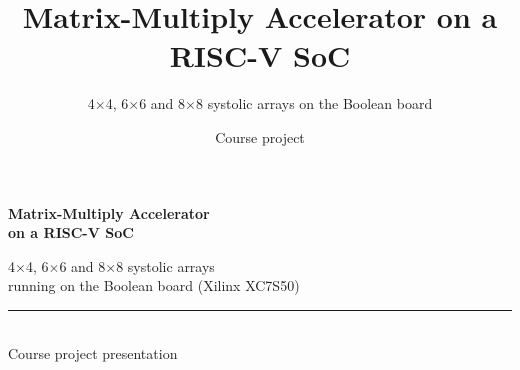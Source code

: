 \documentclass[aspectratio=169,11pt]{beamer}
\title{Matrix-Multiply Accelerator on a RISC-V SoC}
\subtitle{4$\times$4, 6$\times$6 and 8$\times$8 systolic arrays on the Boolean board}
\author{Course project}
\date{}
\begin{document}
\begin{frame}[plain]
  \vfill
  \begin{minipage}{0.62\textwidth}
    {\Large\bfseries\color{ink} Matrix-Multiply Accelerator\\on a RISC-V SoC\par}
    \vspace{4mm}
    {\large\color{muted} 4$\times$4, 6$\times$6 and 8$\times$8 systolic arrays\\running on the Boolean board (Xilinx XC7S50)\par}
    \vspace{8mm}
    {\color{blue}\rule{40mm}{1.2pt}}\\[3mm]
    {\small\color{muted} Course project presentation}
  \end{minipage}
  \vfill
\end{frame}
\end{document}
